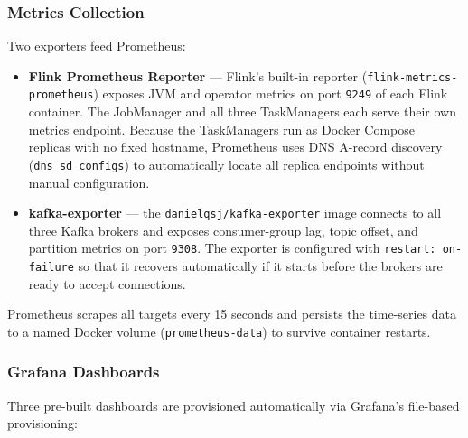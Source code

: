\subsubsection{Metrics Collection}

Two exporters feed Prometheus:
\begin{itemize}
  \item \textbf{Flink Prometheus Reporter} — Flink's built-in reporter
        (\texttt{flink-metrics-prometheus}) exposes JVM and operator metrics on port \texttt{9249}
        of each Flink container.
        The JobManager and all three TaskManagers each serve their own metrics endpoint.
        Because the TaskManagers run as Docker Compose~\cite{docker_compose} replicas with no fixed hostname,
        Prometheus uses DNS A-record discovery~\cite{prometheus_sd} (\texttt{dns\_sd\_configs}) to automatically
        locate all replica endpoints without manual configuration.
  \item \textbf{kafka-exporter} — the \texttt{danielqsj/kafka-exporter} image connects to all
        three Kafka brokers and exposes consumer-group lag, topic offset, and partition metrics
        on port \texttt{9308}.
        The exporter is configured with \texttt{restart: on-failure} so that it recovers
        automatically if it starts before the brokers are ready to accept connections.
\end{itemize}

Prometheus scrapes all targets every 15 seconds and persists the time-series data to a named
Docker volume (\texttt{prometheus-data}) to survive container restarts.

\subsubsection{Grafana Dashboards}

Three pre-built dashboards are provisioned automatically via Grafana's file-based provisioning:

